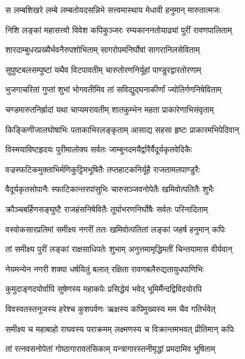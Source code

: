 
\twolineshloka
{स लम्बशिखरे लम्बे लम्बतोयदसन्निभे}
{सत्त्वमास्थाय मेधावी हनुमान् मारुतात्मजः} %

\twolineshloka
{निशि लङ्कां महासत्त्वो विवेश कपिकुञ्जरः}
{रम्यकाननतोयाढ्यां पुरीं रावणपालिताम्} %

\twolineshloka
{शारदाम्बुधरप्रख्यैर्भवनैरुपशोभिताम्}
{सागरोपमनिर्घोषां सागरानिलसेविताम्} %

\twolineshloka
{सुपुष्टबलसम्पुष्टां यथैव विटपावतीम्}
{चारुतोरणनिर्यूहां पाण्डुरद्वारतोरणाम्} %

\twolineshloka
{भुजगाचरितां गुप्तां शुभां भोगवतीमिव}
{तां सविद्युद्घनाकीर्णां ज्योतिर्गणनिषेविताम्} %

\twolineshloka
{चण्डमारुतनिर्ह्रादां यथा चाप्यमरावतीम्}
{शातकुम्भेन महता प्राकारेणाभिसंवृताम्} %

\twolineshloka
{किङ्किणीजालघोषाभिः पताकाभिरलङ्कृताम्}
{आसाद्य सहसा हृष्टः प्राकारमभिपेदिवान्} %

\twolineshloka
{विस्मयाविष्टहृदयः पुरीमालोक्य सर्वतः}
{जाम्बूनदमयैर्द्वारैर्वैदूर्यकृतवेदिकैः} %

\twolineshloka
{वज्रस्फटिकमुक्ताभिर्मणिकुट्टिमभूषितैः}
{तप्तहाटकनिर्यूहै राजतामलपाण्डुरैः} %

\twolineshloka
{वैदूर्यकृतसोपानैः स्फाटिकान्तरपांसुभिः}
{चारुसञ्जवनोपेतैः खमिवोत्पतितैः शुभैः} %

\twolineshloka
{क्रौञ्चबर्हिणसङ्घुष्टै राजहंसनिषेवितैः}
{तूर्याभरणनिर्घोषैः सर्वतः परिनादिताम्} %

\twolineshloka
{वस्वोकसारप्रतिमां समीक्ष्य नगरीं ततः}
{खमिवोत्पतितां लङ्कां जहर्ष हनुमान् कपिः} %

\twolineshloka
{तां समीक्ष्य पुरीं लङ्कां राक्षसाधिपतेः शुभाम्}
{अनुत्तमामृद्धिमतीं चिन्तयामास वीर्यवान्} %

\twolineshloka
{नेयमन्येन नगरी शक्या धर्षयितुं बलात्}
{रक्षिता रावणबलैरुद्यतायुधपाणिभिः} %

\twolineshloka
{कुमुदाङ्गदयोर्वापि सुषेणस्य महाकपेः}
{प्रसिद्धेयं भवेद् भूमिर्मैन्दद्विविदयोरपि} %

\twolineshloka
{विवस्वतस्तनूजस्य हरेश्च कुशपर्वणः}
{ऋक्षस्य कपिमुख्यस्य मम चैव गतिर्भवेत्} %

\twolineshloka
{समीक्ष्य च महाबाहो राघवस्य पराक्रमम्}
{लक्ष्मणस्य च विक्रान्तमभवत् प्रीतिमान् कपिः} %

\twolineshloka
{तां रत्नवसनोपेतां गोष्ठागारावतंसिकाम्}
{यन्त्रागारस्तनीमृद्धां प्रमदामिव भूषिताम्} %

